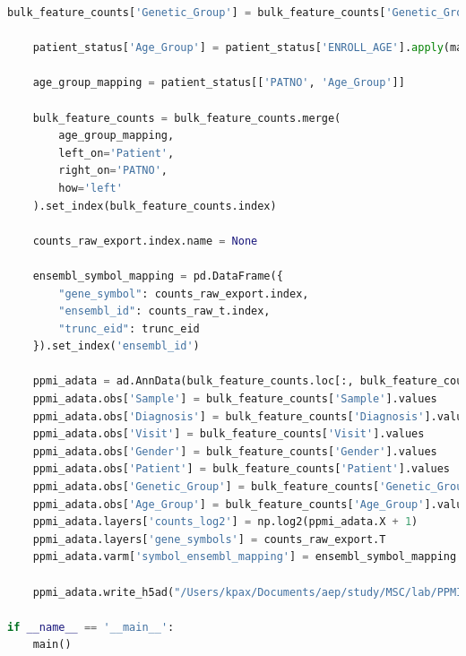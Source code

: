 \documentclass[12pt]{report}
\begin{document}
\begin{lstlisting}[language=Python,caption={data\_consolidation.py: Συγχώνευση δεδομένων σε H5AD τύπο αρχείου}, label=lst:dataconsolidationpy]
    bulk_feature_counts['Genetic_Group'] = bulk_feature_counts['Genetic_Group'].fillna('Unknown')

    patient_status['Age_Group'] = patient_status['ENROLL_AGE'].apply(map_age_group)

    age_group_mapping = patient_status[['PATNO', 'Age_Group']]

    bulk_feature_counts = bulk_feature_counts.merge(
        age_group_mapping,
        left_on='Patient',
        right_on='PATNO',
        how='left'
    ).set_index(bulk_feature_counts.index)

    counts_raw_export.index.name = None

    ensembl_symbol_mapping = pd.DataFrame({
        "gene_symbol": counts_raw_export.index,
        "ensembl_id": counts_raw_t.index,
        "trunc_eid": trunc_eid
    }).set_index('ensembl_id')

    ppmi_adata = ad.AnnData(bulk_feature_counts.loc[:, bulk_feature_counts.columns.str.startswith("ENSG")])
    ppmi_adata.obs['Sample'] = bulk_feature_counts['Sample'].values
    ppmi_adata.obs['Diagnosis'] = bulk_feature_counts['Diagnosis'].values
    ppmi_adata.obs['Visit'] = bulk_feature_counts['Visit'].values
    ppmi_adata.obs['Gender'] = bulk_feature_counts['Gender'].values
    ppmi_adata.obs['Patient'] = bulk_feature_counts['Patient'].values
    ppmi_adata.obs['Genetic_Group'] = bulk_feature_counts['Genetic_Group'].values
    ppmi_adata.obs['Age_Group'] = bulk_feature_counts['Age_Group'].values
    ppmi_adata.layers['counts_log2'] = np.log2(ppmi_adata.X + 1)
    ppmi_adata.layers['gene_symbols'] = counts_raw_export.T
    ppmi_adata.varm['symbol_ensembl_mapping'] = ensembl_symbol_mapping

    ppmi_adata.write_h5ad("/Users/kpax/Documents/aep/study/MSC/lab/PPMI_Project_133_RNASeq/ppmi_adata.h5ad")

if __name__ == '__main__':
    main()
    \end{lstlisting}
\end{document}
